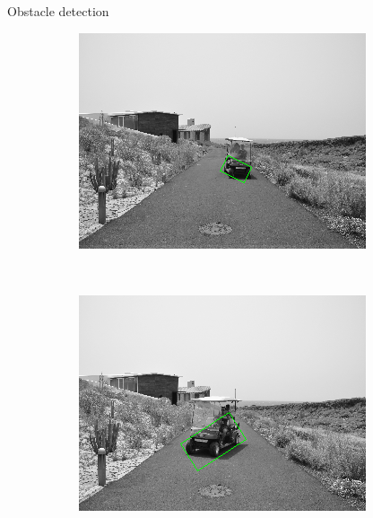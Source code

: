 \begin{frame}{Obstacle detection}
\begin{figure}[h!]
\begin{subfigure}[b]{0.24\columnwidth}
	  \includegraphics[width=\textwidth]{sequence/seq7}\label{fig:seq7}
      \end{subfigure}%
      ~
      \begin{subfigure}[b]{0.24\columnwidth}
	  \includegraphics[width=\textwidth]{sequence/seq8}\label{fig:seq8}
      \end{subfigure}%
  \end{figure}
\end{frame}

